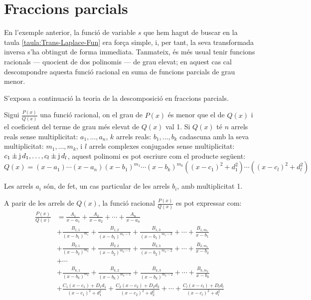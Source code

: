 \section{Fraccions parcials}

En l'exemple anterior, la funció de variable $s$ que hem hagut de
buscar en la taula \vref{taula:Trans-Laplace-Fun} era força simple, i, per tant, la seva transformada inversa s'ha obtingut de forma
immediata. Tanmateix, és més usual tenir funcions racionals ---
quocient de dos polinomis --- de grau elevat; en aquest cas cal
descompondre aquesta funció racional en suma de funcions parcials de
grau menor.

S'exposa a continuació la teoria de la descomposició en fraccions
parcials.

Sigui $\frac{P(x)}{Q(x)}$ una funció racional, on el grau de $P(x)$
és menor que el de $Q(x)$ i el coeficient del terme de grau més
elevat de $Q(x)$ val 1. Si $Q(x)$ té $n$ arrels reals sense
multiplicitat: $a_1,\ldots,a_n$, $k$ arrels reals: $b_1,\ldots,b_k$
cadascuna amb la seva multiplicitat: $m_1,\ldots,m_k$, i $l$ arrels
complexes conjugades sense multiplicitat: $c_1\pm
\mathrm{j}\,d_1,\ldots,c_l\pm \mathrm{j}\,d_l$, aquest polinomi es pot escriure
com el producte següent:
\begin{equation}
    Q(x)= (x-a_1) \cdots (x-a_n)(x-b_1)^{m_1} \cdots (x-b_k)^{m_k}
    ((x-c_1)^2+d_1^2)\cdots((x-c_l)^2+d_l^2)
\end{equation}

Les arrels $a_i$ són, de fet, un cas particular de les arrels $b_i$,
amb multiplicitat 1.

A parir de les arrels de $Q(x)$, la funció  racional
$\frac{P(x)}{Q(x)}$ es pot expressar com:
\begin{equation}\begin{split}
    \frac{P(x)}{Q(x)} &= \frac{A_1}{x-a_1} + \frac{A_2}{x-a_2}
    + \cdots + \frac{A_n}{x-a_n}  \\[1.5ex]
   &+ \frac{B_{1,1}}{(x-b_1)^{m_1}} + \frac{B_{1,2}}{(x-b_1)^{m_1-1}}
   + \frac{B_{1,3}}{(x-b_1)^{m_1-2}} + \cdots +
   \frac{B_{1,m_1}}{x-b_1} \\[1.5ex]
&+ \frac{B_{2,1}}{(x-b_2)^{m_2}} + \frac{B_{2,2}}{(x-b_2)^{m_2-1}}
   + \frac{B_{2,3}}{(x-b_2)^{m_2-2}} + \cdots  +
   \frac{B_{2,m_2}}{x-b_2} \\[1.5ex]
   &+ \cdots \\[1ex]
&+ \frac{B_{k,1}}{(x-b_k)^{m_k}} + \frac{B_{k,2}}{(x-b_k)^{m_k-1}}
   + \frac{B_{k,3}}{(x-b_k)^{m_k-2}} + \cdots +
   \frac{B_{k,m_k}}{x-b_k}\\[1.5ex]
&+ \frac{C_1(x-c_1)+D_1 d_1}{(x-c_1)^2+d_1^2}+ \frac{C_2(x-c_2)+D_2
d_2}{(x-c_2)^2+d_2^2} +  \cdots +\frac{C_l(x-c_l)+D_l d_l}{(x-c_l)^2+d_l^2}\\[1.5ex]
\end{split}\end{equation}

